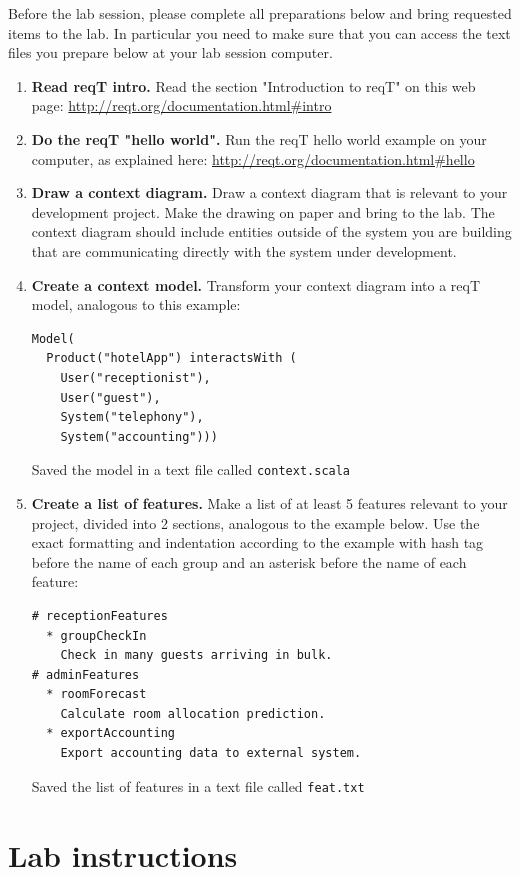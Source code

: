 \documentclass[11pt]{article}
\begin{document}
Before the lab session, please complete all preparations below and bring requested items to the lab. In particular you need to make sure that you can access the text files you prepare below at your lab session computer.

\begin{enumerate}
\item {\bf Read reqT intro.} Read the section "Introduction to reqT" on this web page: \newline \url{http://reqt.org/documentation.html\#intro} 
\item {\bf Do the reqT "hello world".} Run the reqT hello world example on your computer, as explained here: \newline \url{http://reqt.org/documentation.html\#hello}
\item {\bf Draw a context diagram.} Draw a context diagram that  is relevant to your development project. Make the drawing on paper and bring to the lab. The context diagram should include entities outside of the system you are building that are communicating directly with the system under development. 
\item {\bf Create a context model.} Transform your context diagram into a reqT model, analogous to this  example: 
{\footnotesize\begin{verbatim}
Model(
  Product("hotelApp") interactsWith (
    User("receptionist"), 
    User("guest"), 
    System("telephony"), 
    System("accounting")))
\end{verbatim}}
Saved the model in a text file called \verb+context.scala+
\item {\bf Create a list of features.} Make a list of at least 5 features relevant to your project, divided into 2 sections, analogous to the example below. Use the exact formatting and indentation according to the example with hash tag before the name of each group and an asterisk before the name of each feature: 
{\footnotesize\begin{verbatim}
# receptionFeatures
  * groupCheckIn
    Check in many guests arriving in bulk.
# adminFeatures
  * roomForecast
    Calculate room allocation prediction.
  * exportAccounting
    Export accounting data to external system.
\end{verbatim}}
Saved the list of features in a text file called \verb+feat.txt+  
\end{enumerate}
\clearpage\newpage

\section{Lab instructions}
\end{document}
